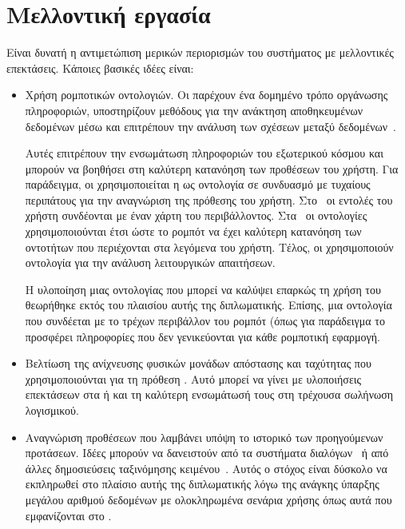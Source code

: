 \section{Μελλοντική εργασία}
Είναι δυνατή η αντιμετώπιση μερικών περιορισμών του συστήματος με μελλοντικές επεκτάσεις.
Κάποιες βασικές ιδέες είναι:
\begin{itemize}
    \item Χρήση ρομποτικών οντολογιών.
          Οι  παρέχουν ένα δομημένο τρόπο οργάνωσης πληροφοριών,
          υποστηρίζουν μεθόδους για την ανάκτηση αποθηκευμένων δεδομένων μέσω 
          και επιτρέπουν την ανάλυση των σχέσεων μεταξύ δεδομένων~\cite{diamantopoulos2017software}.

          Αυτές επιτρέπουν την ενσωμάτωση πληροφοριών του εξωτερικού κόσμου και μπορούν να βοηθήσει στη καλύτερη κατανόηση των προθέσεων του χρήστη.
          Για παράδειγμα, οι \citet{hu2009understanding} χρησιμοποιείται η  ως οντολογία σε συνδυασμό με τυχαίους περιπάτους για την αναγνώριση της πρόθεσης του χρήστη.
          Στο~\cite{zang2018translating} οι εντολές του χρήστη συνδέονται με έναν χάρτη του περιβάλλοντος.
          Στα~\cite{salamknowledge,zhang2018learning,nyga2018grounding} οι οντολογίες χρησιμοποιούνται έτσι ώστε το ρομπότ να έχει καλύτερη κατανόηση των οντοτήτων που περιέχονται στα λεγόμενα του χρήστη.
          Τέλος, οι \citet{diamantopoulos2017software} χρησιμοποιούν οντολογία για την ανάλυση λειτουργικών απαιτήσεων.

          Η υλοποίηση μιας οντολογίας που μπορεί να καλύψει επαρκώς τη χρήση του \metamodel{} θεωρήθηκε εκτός του πλαισίου αυτής της διπλωματικής.
          Επίσης, μια οντολογία που συνδέεται με το τρέχων περιβάλλον του ρομπότ (όπως για παράδειγμα το  προσφέρει πληροφορίες που δεν γενικεύονται για κάθε ρομποτική εφαρμογή.
    \item Βελτίωση της ανίχνευσης φυσικών μονάδων απόστασης και ταχύτητας που χρησιμοποιούνται για τη πρόθεση .
          Αυτό μπορεί να γίνει με υλοποιήσεις επεκτάσεων στα  ή  και τη καλύτερη ενσωμάτωσή τους στη τρέχουσα σωλήνωση λογισμικού.
    \item Αναγνώριση προθέσεων που λαμβάνει υπόψη το ιστορικό των προηγούμενων προτάσεων.
          Ιδέες μπορούν να δανειστούν από τα συστήματα διαλόγων~\cite{bhargava2013easy} ή από άλλες δημοσιεύσεις ταξινόμησης κειμένου~\cite{lee2016sequential}.
          Αυτός ο στόχος είναι δύσκολο να εκπληρωθεί στο πλαίσιο αυτής της διπλωματικής λόγω της ανάγκης ύπαρξης μεγάλου αριθμού δεδομένων με ολοκληρωμένα σενάρια χρήσης όπως αυτά που εμφανίζονται στο .


\end{itemize}
